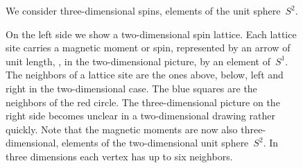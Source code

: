 \begin{figure}
  \centering
  \caption{We consider three-dimensional spins, \ie{} elements of the unit
  sphere~$S^2$.}
\label{fig:s2}
\end{figure}

\begin{figure}
  \centering
  \caption{On the left side we show a two-dimensional spin lattice. Each lattice
  site carries a magnetic moment or spin, represented by an arrow of unit
  length, \ie{}, in the two-dimensional picture, by an element of~$S^1$. The
  neighbors of a lattice site are the ones above, below, left and right in the
  two-dimensional case. The blue squares are the neighbors of the red circle.
  The three-dimensional picture on the right side becomes unclear in a
  two-dimensional drawing rather quickly. Note that the magnetic moments are now
  also three-dimensional, \ie{} elements of the two-dimensional unit
  sphere~$S^2$. In three dimensions each vertex has up to six neighbors.}
\label{fig:lattice}
\end{figure}


